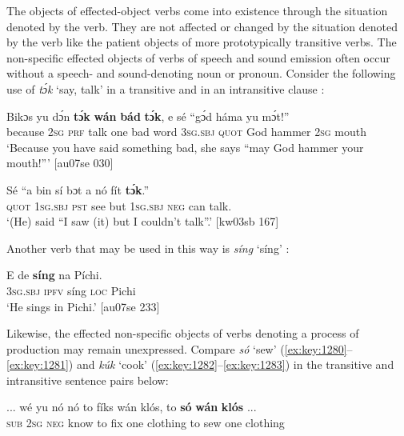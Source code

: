 The objects of effected-object verbs come into existence through the situation denoted by the verb. They are not affected or changed by the situation denoted by the verb like the patient objects of more prototypically transitive verbs. The non-specific effected objects of verbs of speech and sound emission often occur without a speech- and sound-denoting noun or pronoun. Consider the following use of \textit{tɔ́k} ‘say, talk’ in a transitive  and in an intransitive clause : 



\ea%
    \label{ex:key:1277}
    \gll Bikɔs  yu  dɔ́n  \textbf{tɔ́k}  \textbf{wán}    \textbf{bád}  \textbf{tɔ́k},    e    sé
“gɔ́d    háma  yu  mɔ́t!”\\
because  \textsc{2sg}  \textsc{prf}  talk  one    bad  word  \textsc{3sg.sbj}  \textsc{quot}
\phantom{‘}God    hammer  \textsc{2sg}  mouth\\

\glt ‘Because you have said something bad, she says 
“may God hammer your mouth!”’ [au07se 030]
\z


\ea%
    \label{ex:key:1278}
    \gll Sé    “a    bin  sí  bɔt  a    nó  fít  \textbf{tɔ́k}.”\\
\textsc{quot}    \textsc{1sg.sbj}  \textsc{pst}  see  but  \textsc{1sg.sbj}  \textsc{neg}  can  talk.\\

\glt ‘(He) said “I saw (it) but I couldn’t talk”.’ [kw03sb 167]
\z

Another verb that may be used in this way is \textit{síng} ‘síng’ :


\ea%
    \label{ex:key:1279}
    \gll E    de  \textbf{síng}    na  Píchi.\\
\textsc{3sg.sbj}  \textsc{ipfv}  síng    \textsc{loc}  Pichi\\

\glt ‘He sings in Pichi.’ [au07se 233]
\z

Likewise, the effected non-specific objects of verbs denoting a process of production may remain unexpressed. Compare \textit{só} ‘sew’ (\ref{ex:key:1280}–\ref{ex:key:1281}) and \textit{kúk} ‘cook’ (\ref{ex:key:1282}–\ref{ex:key:1283}) in the transitive and intransitive sentence pairs below: 


\ea%
    \label{ex:key:1280}
    \gll \op...\cp{}  wé  yu  nó  nó    to  fíks  wán  klós,  to  \textbf{só}  \textbf{wán}    \textbf{klós}    \op...\cp{}\\
  {} \textsc{sub}  \textsc{2sg}  \textsc{neg}  know  to  fix  one  clothing  to  sew  one    clothing\\

